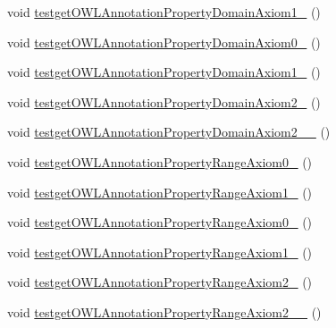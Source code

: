 \begin{DoxyCompactItemize}
void \hyperlink{classorg_1_1semanticweb_1_1owlapi_1_1api_1_1test_1_1_null_check_test_case_a7b895ecfe3ea7c744ea9b0f253310e8c}{testget\-O\-W\-L\-Annotation\-Property\-Domain\-Axiom1\-\_} ()
\item 
void \hyperlink{classorg_1_1semanticweb_1_1owlapi_1_1api_1_1test_1_1_null_check_test_case_aee34ae865366145ad8c3a4794a506370}{testget\-O\-W\-L\-Annotation\-Property\-Domain\-Axiom0\-\_} ()
\item 
void \hyperlink{classorg_1_1semanticweb_1_1owlapi_1_1api_1_1test_1_1_null_check_test_case_a207101b38562984ae1d68abd26e90155}{testget\-O\-W\-L\-Annotation\-Property\-Domain\-Axiom1\-\_} ()
\item 
void \hyperlink{classorg_1_1semanticweb_1_1owlapi_1_1api_1_1test_1_1_null_check_test_case_af8b8ce4d0a2cc5874aa2033be714aba4}{testget\-O\-W\-L\-Annotation\-Property\-Domain\-Axiom2\-\_} ()
\item 
void \hyperlink{classorg_1_1semanticweb_1_1owlapi_1_1api_1_1test_1_1_null_check_test_case_a869f75552c5c852f4ec59d618bdd6fbd}{testget\-O\-W\-L\-Annotation\-Property\-Domain\-Axiom2\-\_\-\_} ()
\item 
void \hyperlink{classorg_1_1semanticweb_1_1owlapi_1_1api_1_1test_1_1_null_check_test_case_a1b52d6acbee5852678d159e4375e72de}{testget\-O\-W\-L\-Annotation\-Property\-Range\-Axiom0\-\_} ()
\item 
void \hyperlink{classorg_1_1semanticweb_1_1owlapi_1_1api_1_1test_1_1_null_check_test_case_a89e79d664a3f874b23dceb066490af1b}{testget\-O\-W\-L\-Annotation\-Property\-Range\-Axiom1\-\_} ()
\item 
void \hyperlink{classorg_1_1semanticweb_1_1owlapi_1_1api_1_1test_1_1_null_check_test_case_a89541a29d324ff97a8a6751bccb6c85f}{testget\-O\-W\-L\-Annotation\-Property\-Range\-Axiom0\-\_} ()
\item 
void \hyperlink{classorg_1_1semanticweb_1_1owlapi_1_1api_1_1test_1_1_null_check_test_case_a0c4bb88cf2c77645c3ca0f1f12091689}{testget\-O\-W\-L\-Annotation\-Property\-Range\-Axiom1\-\_} ()
\item 
void \hyperlink{classorg_1_1semanticweb_1_1owlapi_1_1api_1_1test_1_1_null_check_test_case_a708dbe41bba7d342c305c2ce4ad2524c}{testget\-O\-W\-L\-Annotation\-Property\-Range\-Axiom2\-\_} ()
\item 
void \hyperlink{classorg_1_1semanticweb_1_1owlapi_1_1api_1_1test_1_1_null_check_test_case_af71d2d935bb46aea41c8870d3fad3e64}{testget\-O\-W\-L\-Annotation\-Property\-Range\-Axiom2\-\_\-\_} ()
\item 

\end{DoxyCompactItemize}
